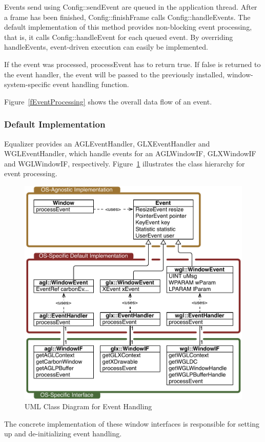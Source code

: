 \documentclass[10pt,a4]{scrartcl}
\newcommand{\fig}[1]{Figure~\ref{#1}}
\begin{document}
Events send using \textsf{Config::sendEvent} are queued in the
application thread. After a frame has been finished,
\textsf{Config::finishFrame} calls \textsf{Config::handleEvents}. The
default implementation of this method provides non-blocking event
processing, that is, it calls \textsf{Config::handleEvent} for each
queued event. By overriding \textsf{handleEvents}, event-driven
execution can easily be implemented.

If the event was processed, \textsf{processEvent} has to return
\textsf{true}. If \textsf{false} is returned to the event handler, the
event will be passed to the previously installed, window-system-specific
event handling function.

\fig{fEventProcessing} shows the overall data flow of an event.

\subsubsection{Default Implementation}

Equalizer provides an \textsf{AGLEvent\-Handler},
\textsf{GLXEventHandler} and \textsf{WGL\-Event\-Handler}, which handle
events for an \textsf{AGLWindowIF}, \textsf{GLXWindowIF} and
\textsf{WGL\-Win\-dowIF}, respectively. \fig{fEventUML} illustrates the
class hierarchy for event processing.

\begin{figure}
  \includegraphics[width=.618\textwidth]{images/eventUML.pdf}
  {\caption{\label{fEventUML}UML Class Diagram for Event Handling}}
\end{figure}
The concrete implementation of these window interfaces is responsible
for setting up and de-initializing event handling.
\end{document}
